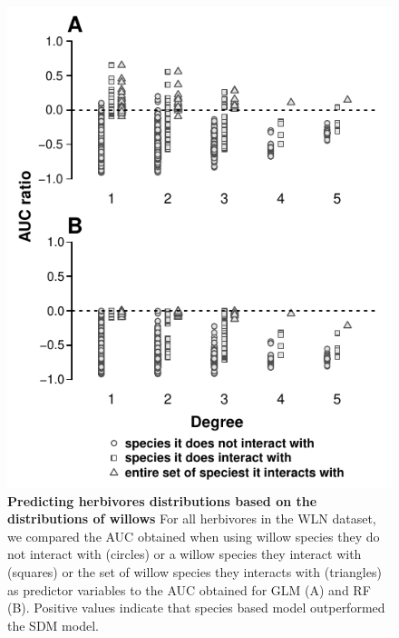 \begin{figure}[htbp]
\centering
\includegraphics[width=.72\textwidth]{chapitre3/figS9.pdf}
\caption{\textbf{Predicting herbivores distributions based on the
distributions of willows} For all herbivores in the WLN
dataset, we compared the AUC obtained when using willow species they do not
interact with (circles) or a willow species they interact with (squares) or the set
of willow species they interacts with (triangles) as predictor variables to
the AUC obtained for GLM (A) and RF (B). Positive values indicate that species based model outperformed
the SDM model.\label{fig:ratauc}}
\end{figure}
